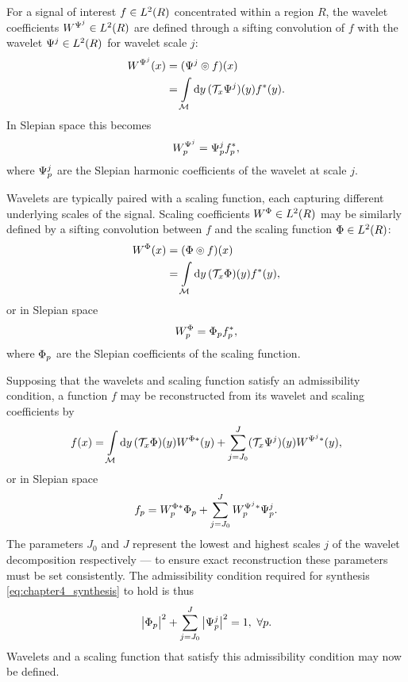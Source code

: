 For a signal of interest \(f \in L^{2}(R)\) concentrated within a region \(R\), the wavelet coefficients \(W^{\Psi^{j}} \in L^{2}(R)\) are defined through a sifting convolution of \(f\) with the wavelet \(\Psi^{j} \in L^{2}(R)\) for wavelet scale \(j\):
%
\begin{align}
	W^{\Psi^{j}}(x)
	 & = (\Psi^{j} \circledcirc{} f)(x) \nonumber                                \\
	 & = \int\limits_{\mathcal{M}} \dd{y} (\mathcal{T}_{x}\Psi^{j})(y) f^{\ast}(y).
\end{align}
%
In Slepian space this becomes
%
\begin{equation}\label{eq:chapter4_slepian_wavelet_p}
	{W}_{p}^{\Psi^{j}}
	= {\Psi}_{p}^{j} {f}_{p}^{\ast},
\end{equation}
%
where \({\Psi}_{p}^{j}\) are the Slepian harmonic coefficients of the wavelet at scale \(j\).

Wavelets are typically paired with a scaling function, each capturing different underlying scales of the signal.
Scaling coefficients \(W^{\Phi} \in L^{2}(R)\) may be similarly defined by a sifting convolution between \(f\) and the scaling function \(\Phi \in L^{2}(R)\):
%
\begin{align}
	W^{\Phi}(x)
	 & = (\Phi \circledcirc{} f)(x) \nonumber                                \\
	 & = \int\limits_{\mathcal{M}} \dd{y} (\mathcal{T}_{x}\Phi)(y) f^{\ast}(y),
\end{align}
%
or in Slepian space
%
\begin{equation}\label{eq:chapter4_slepian_scaling_p}
	{W}_{p}^{\Phi}
	= {\Phi}_{p} {f}_{p}^{\ast},
\end{equation}
%
where \({\Phi}_{p}\) are the Slepian coefficients of the scaling function.

Supposing that the wavelets and scaling function satisfy an admissibility condition, a function \(f\) may be reconstructed from its wavelet and scaling coefficients by
%
\begin{equation}\label{eq:chapter4_synthesis}
	f(x)
	= \int\limits_{\mathcal{M}} \dd{y}
	(\mathcal{T}_{x}\Phi)(y) W^{\Phi\ast}(y)
	+ \sum\limits_{j=J_{0}}^{J} (\mathcal{T}_{x}\Psi^{j})(y) W^{\Psi^{j}\ast}(y),
\end{equation}
%
or in Slepian space
%
\begin{equation}
	{f}_{p}
	= {W}_{p}^{\Phi\ast} {\Phi}_{p}
	+ \sum\limits_{j=J_{0}}^{J} {W}_{p}^{\Psi^{j}\ast} {\Psi}_{p}^{j}.
\end{equation}
%
The parameters \(J_{0}\) and \(J\) represent the lowest and highest scales \(j\) of the wavelet decomposition respectively --- to ensure exact reconstruction these parameters must be set consistently.
The admissibility condition required for synthesis \cref{eq:chapter4_synthesis} to hold is thus
%
\begin{equation}\label{eq:chapter4_admissibility}
	\big\lvert{\Phi}_{p}\big\rvert^{2}
	+ \sum\limits_{j=J_{0}}^{J} \big\lvert{\Psi}_{p}^{j}\big\rvert^{2}
	= 1,\ \forall p.
\end{equation}
%
Wavelets and a scaling function that satisfy this admissibility condition may now be defined.

